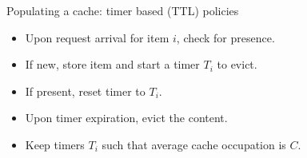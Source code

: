 \documentclass[aspectratio=169]{beamer}
\begin{document}
\begin{frame}{Populating a cache: timer based (TTL) policies}
		
	\begin{itemize}
		\item<1-> Upon request arrival for item $i$, check for presence.
		\item<2-> If new, store item and start a \alert{timer} $T_i$ to evict.
		\item<3-> If present, reset timer to $T_i$.
		\item<4-> Upon timer expiration, evict the content.
		\item<5-> Keep timers $T_i$ such that \alert{average} cache occupation is $C$.
	\end{itemize}
	
	\vspace{3em}
	
	\centering
	
\end{frame}





		
	 




\end{document}
